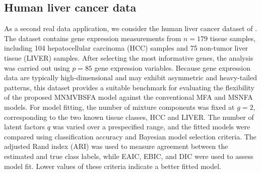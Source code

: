 \documentclass[twoside]{article}
\theoremstyle{definition}
\begin{document}
\subsection{Human liver cancer data}
\vspace{-0.5cm}
As a second real data application, we consider the human liver cancer dataset of \cite{Chen2002}. The dataset contains gene expression measurements from \(n=179\) tissue samples, including 104 hepatocellular carcinoma (HCC) samples and 75 non-tumor liver tissue (LIVER) samples. After selecting the most informative genes, the analysis was carried out using \(p=85\) gene expression variables. Because gene expression data are typically high-dimensional and may exhibit asymmetric and heavy-tailed patterns, this dataset provides a suitable benchmark for evaluating the flexibility of the proposed MNMVBSFA model against the conventional MFA and MSNFA models. For model fitting, the number of mixture components was fixed at \(g=2\), corresponding to the two known tissue classes, HCC and LIVER. The number of latent factors \(q\) was varied over a prespecified range, and the fitted models were compared using classification accuracy and Bayesian model selection criteria. The adjusted Rand index (ARI) was used to measure agreement between the estimated and true class labels, while EAIC, EBIC, and DIC were used to assess model fit. Lower values of these criteria indicate a better fitted model.
\end{document}
